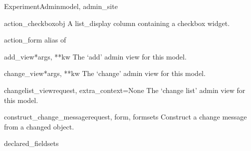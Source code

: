 \documentclass[letterpaper,10pt,english]{sphinxmanual}
\begin{document}
\hypertarget{data.admin.ExperimentAdmin}{}\begin{classdesc}{ExperimentAdmin}{model, admin\_site}~

\hypertarget{data.admin.ExperimentAdmin.action_checkbox}{}\begin{methoddesc}{action\_checkbox}{obj}
A list\_display column containing a checkbox widget.
\end{methoddesc}

\hypertarget{data.admin.ExperimentAdmin.action_form}{}\begin{memberdesc}{action\_form}
alias of 
\end{memberdesc}

\hypertarget{data.admin.ExperimentAdmin.add_view}{}\begin{methoddesc}{add\_view}{*args, **kw}
The `add' admin view for this model.
\end{methoddesc}

\hypertarget{data.admin.ExperimentAdmin.change_view}{}\begin{methoddesc}{change\_view}{*args, **kw}
The `change' admin view for this model.
\end{methoddesc}

\hypertarget{data.admin.ExperimentAdmin.changelist_view}{}\begin{methoddesc}{changelist\_view}{request, extra\_context=None}
The `change list' admin view for this model.
\end{methoddesc}

\hypertarget{data.admin.ExperimentAdmin.construct_change_message}{}\begin{methoddesc}{construct\_change\_message}{request, form, formsets}
Construct a change message from a changed object.
\end{methoddesc}

\hypertarget{data.admin.ExperimentAdmin.declared_fieldsets}{}\begin{memberdesc}{declared\_fieldsets}\end{memberdesc}


\end{classdesc}
\end{document}

